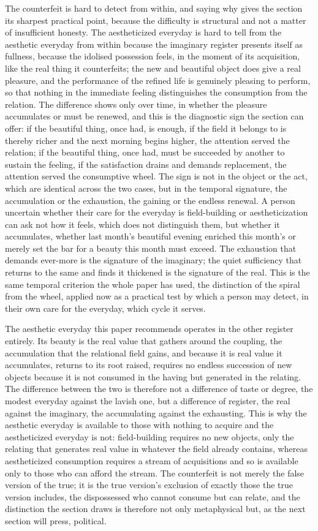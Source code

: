 The counterfeit is hard to detect from within, and saying why gives the section its sharpest practical point, because the difficulty is structural and not a matter of insufficient honesty. The aestheticized everyday is hard to tell from the aesthetic everyday from within because the imaginary register presents itself as fullness, because the idolised possession feels, in the moment of its acquisition, like the real thing it counterfeits; the new and beautiful object does give a real pleasure, and the performance of the refined life is genuinely pleasing to perform, so that nothing in the immediate feeling distinguishes the consumption from the relation. The difference shows only over time, in whether the pleasure accumulates or must be renewed, and this is the diagnostic sign the section can offer: if the beautiful thing, once had, is enough, if the field it belongs to is thereby richer and the next morning begins higher, the attention served the relation; if the beautiful thing, once had, must be succeeded by another to sustain the feeling, if the satisfaction drains and demands replacement, the attention served the consumptive wheel. The sign is not in the object or the act, which are identical across the two cases, but in the temporal signature, the accumulation or the exhaustion, the gaining or the endless renewal. A person uncertain whether their care for the everyday is field-building or aestheticization can ask not how it feels, which does not distinguish them, but whether it accumulates, whether last month's beautiful evening enriched this month's or merely set the bar for a beauty this month must exceed. The exhaustion that demands ever-more is the signature of the imaginary; the quiet sufficiency that returns to the same and finds it thickened is the signature of the real. This is the same temporal criterion the whole paper has used, the distinction of the spiral from the wheel, applied now as a practical test by which a person may detect, in their own care for the everyday, which cycle it serves.

The aesthetic everyday this paper recommends operates in the other register entirely. Its beauty is the real value that gathers around the coupling, the accumulation that the relational field gains, and because it is real value it accumulates, returns to its root raised, requires no endless succession of new objects because it is not consumed in the having but generated in the relating. The difference between the two is therefore not a difference of taste or degree, the modest everyday against the lavish one, but a difference of register, the real against the imaginary, the accumulating against the exhausting. This is why the aesthetic everyday is available to those with nothing to acquire and the aestheticized everyday is not: field-building requires no new objects, only the relating that generates real value in whatever the field already contains, whereas aestheticized consumption requires a stream of acquisitions and so is available only to those who can afford the stream. The counterfeit is not merely the false version of the true; it is the true version's exclusion of exactly those the true version includes, the dispossessed who cannot consume but can relate, and the distinction the section draws is therefore not only metaphysical but, as the next section will press, political.
